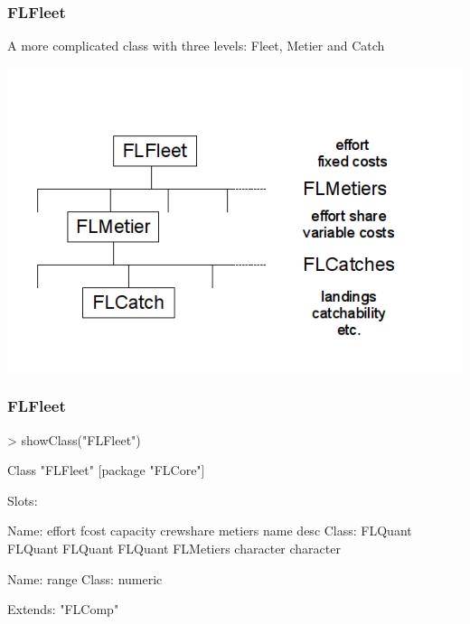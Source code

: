 \documentclass{beamer}%
\begin{document}
\begin{frame}
  \frametitle{FLFleet}
A more complicated class with three levels: Fleet, Metier and Catch
   \begin{center}
      \includegraphics[width=1\textwidth]{FLFleet.png}
   \end{center}
\end{frame}

\begin{frame}[containsverbatim]
  \frametitle{FLFleet}
{\tiny{
\begin{Schunk}
\begin{Sinput}
> showClass("FLFleet")
\end{Sinput}
\begin{Soutput}
Class "FLFleet" [package "FLCore"]

Slots:
                                                                            
Name:     effort     fcost  capacity crewshare   metiers      name      desc
Class:   FLQuant   FLQuant   FLQuant   FLQuant FLMetiers character character
                
Name:      range
Class:   numeric

Extends: "FLComp"
\end{Soutput}
\end{Schunk}
}}

\end{frame}
\end{document}
